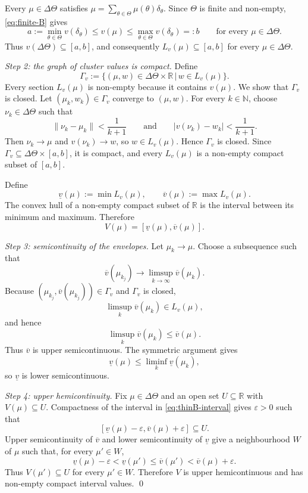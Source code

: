 \documentclass[11pt]{article}
\newcommand{\sep}{\,|\,}
\begin{document}
Every $\mu\in\Delta\Theta$ satisfies $\mu=\sum_{\theta\in\Theta}\mu(\theta)\delta_\theta$. Since $\Theta$ is finite and non-empty, \eqref{eq:finite-B} gives
\[
    a:=\min_{\theta\in\Theta}v(\delta_\theta)
    \leq v(\mu)\leq
    \max_{\theta\in\Theta}v(\delta_\theta)=:b
    \qquad\text{for every }\mu\in\Delta\Theta.
\]
Thus $v(\Delta\Theta)\subseteq[a,b]$, and consequently $L_v(\mu)\subseteq[a,b]$ for every $\mu\in\Delta\Theta$.

\emph{Step 2: the graph of cluster values is compact.} Define
\[
    \Gamma_v:=\{(\mu,w)\in\Delta\Theta\times\mathbb{R}\sep w\in L_v(\mu)\}.
\]
Every section $L_v(\mu)$ is non-empty because it contains $v(\mu)$. We show that $\Gamma_v$ is closed. Let $(\mu_k,w_k)\in\Gamma_v$ converge to $(\mu,w)$. For every $k\in\mathbb{N}$, choose $\nu_k\in\Delta\Theta$ such that
\[
    \lVert\nu_k-\mu_k\rVert<\frac{1}{k+1}
    \qquad\text{and}\qquad
    \lvert v(\nu_k)-w_k\rvert<\frac{1}{k+1}.
\]
Then $\nu_k\to\mu$ and $v(\nu_k)\to w$, so $w\in L_v(\mu)$. Hence $\Gamma_v$ is closed. Since $\Gamma_v\subseteq\Delta\Theta\times[a,b]$, it is compact, and every $L_v(\mu)$ is a non-empty compact subset of $[a,b]$.

Define
\[
    \underline v(\mu):=\min L_v(\mu),
    \qquad
    \overline v(\mu):=\max L_v(\mu).
\]
The convex hull of a non-empty compact subset of $\mathbb{R}$ is the interval between its minimum and maximum. Therefore
\begin{equation}\label{eq:thinB-interval}
    V(\mu)
    =
    [\underline v(\mu),\overline v(\mu)].
\end{equation}

\emph{Step 3: semicontinuity of the envelopes.} Let $\mu_k\to\mu$. Choose a subsequence such that
\[
    \overline v(\mu_{k_j})\to\limsup_{k\to\infty}\overline v(\mu_k).
\]
Because $(\mu_{k_j},\overline v(\mu_{k_j}))\in\Gamma_v$ and $\Gamma_v$ is closed,
\[
    \limsup_k\overline v(\mu_k)\in L_v(\mu),
\]
and hence
\[
    \limsup_k\overline v(\mu_k)\leq\overline v(\mu).
\]
Thus $\overline v$ is upper semicontinuous. The symmetric argument gives
\[
    \underline v(\mu)\leq\liminf_k\underline v(\mu_k),
\]
so $\underline v$ is lower semicontinuous.

\emph{Step 4: upper hemicontinuity.} Fix $\mu\in\Delta\Theta$ and an open set $U\subseteq\mathbb{R}$ with $V(\mu)\subseteq U$. Compactness of the interval in \eqref{eq:thinB-interval} gives $\varepsilon>0$ such that
\[
    [\underline v(\mu)-\varepsilon,\overline v(\mu)+\varepsilon]\subseteq U.
\]
Upper semicontinuity of $\overline v$ and lower semicontinuity of $\underline v$ give a neighbourhood $W$ of $\mu$ such that, for every $\mu'\in W$,
\[
    \underline v(\mu)-\varepsilon
    <
    \underline v(\mu')
    \leq
    \overline v(\mu')
    <
    \overline v(\mu)+\varepsilon.
\]
Thus $V(\mu')\subseteq U$ for every $\mu'\in W$. Therefore $V$ is upper hemicontinuous and has non-empty compact interval values. \qed
\end{document}
